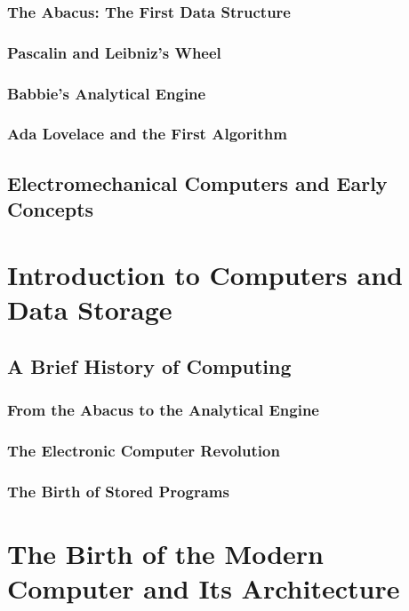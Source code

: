 \documentclass[12pt, oneside]{book}
\begin{document}
	\subsection{The Abacus: The First Data Structure}
	
	\subsection{Pascalin and Leibniz's Wheel}
	
	\subsection{Babbie's Analytical Engine}
	
	\subsection{Ada Lovelace and the First Algorithm}
	
	\section{Electromechanical Computers and Early Concepts}
	
	\chapter{Introduction to Computers and Data Storage}
	\section{A Brief History of Computing}
	
	\subsection{From the Abacus to the Analytical Engine}
	
	\subsection{The Electronic Computer Revolution}
	
	\subsection{The Birth of Stored Programs}
	
	\chapter{The Birth of the Modern Computer and Its Architecture}
\end{document}
